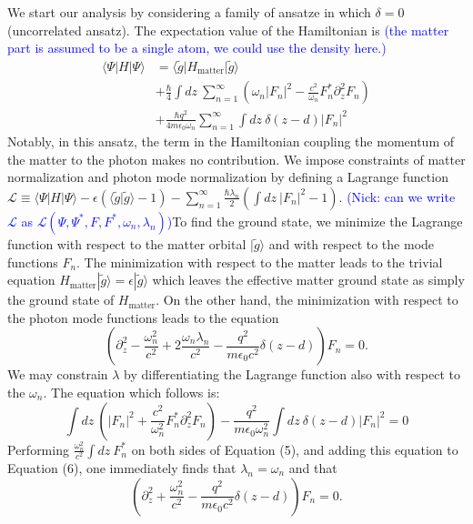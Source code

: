 \documentclass[aps,prb,twocolumn,
	groupedaddress,superscriptaddress,
	amsfonts,amssymb,amsmath,floatfix,
	citeautoscript]{revtex4-1}
\newcommand{\Jadd}[1]{\textcolor{blue}{#1}}
\begin{document}
We start our analysis by considering a family of ansatze in which $\delta = 0$ (uncorrelated ansatz).  The expectation value of the Hamiltonian is \Jadd{(the matter part is assumed to be a single atom, we could use the density here.)}
\begin{align}
\langle \Psi | H | \Psi \rangle &= \langle \tilde{g} |H_{\text{matter}} | \tilde{g}\rangle \nonumber \\ &+ \frac{\hbar}{4}\int dz ~\sum\limits_{n=1}^{\infty}\left(\omega_n|F_n|^2 - \frac{c^2}{\omega_n}F_n^*\partial_z^2F_n\right) \nonumber \\ &+ \frac{\hbar q^2}{4m\epsilon_0\omega_n}\sum\limits_{n=1}^{\infty} \int dz~\delta(z-d)|F_n|^2
\end{align}
Notably, in this ansatz, the term in the Hamiltonian coupling the momentum of the matter to the photon makes no contribution. We impose constraints of matter normalization and photon mode normalization by defining a Lagrange function $\mathcal{L} \equiv \langle \Psi | H | \Psi \rangle - \epsilon(\langle \tilde{g}|\tilde{g}\rangle-1)-\sum\limits_{n=1}^{\infty}\frac{\hbar\lambda_n}{2}\left( \int dz~|F_n|^2-1\right)$. \Jadd{(Nick: can we write $\mathcal{L}$ as $\mathcal{L}(\Psi, \Psi^*, F, F^*, \omega_n, \lambda_n)$)}To find the ground state, we minimize the Lagrange function with respect to the matter orbital $|\tilde{g}\rangle$ and with respect to the mode functions $F_n$. The minimization with respect to the matter leads to the trivial equation $H_{\text{matter}} |\tilde{g}\rangle = \epsilon|\tilde{g}\rangle$ which leaves the effective matter ground state as simply the ground state of $H_{\text{matter}}$. On the other hand, the minimization with respect to the photon mode functions leads to  the equation
\begin{equation}
\left(\partial_z^2-\frac{\omega^2_n}{c^2}+2\frac{\omega_n\lambda_n}{c^2}-\frac{q^2 }{m\epsilon_0 c^2}\delta(z-d)\right)F_n  = 0.
\end{equation}
We may constrain $\lambda$ by differentiating the Lagrange function also with respect to the $\omega_n$. The equation which follows is:
\begin{equation}
\int dz ~\left(|F_n|^2 + \frac{c^2}{\omega^2_n}F_n^*\partial_z^2F_n\right) - \frac{ q^2}{m\epsilon_0\omega^2_n} \int dz~\delta(z-d)|F_n|^2 = 0
\end{equation}
Performing $\frac{\omega_n^2}{c^2}\int dz~F_n^*$ on both sides of Equation (5), and adding this equation to Equation (6), one immediately finds that $\lambda_n = \omega_n$ and that
\begin{equation}
\left(\partial_z^2+\frac{\omega^2_n}{c^2}-\frac{q^2 }{m\epsilon_0 c^2}\delta(z-d)\right)F_n  = 0.
\end{equation}
\end{document}
